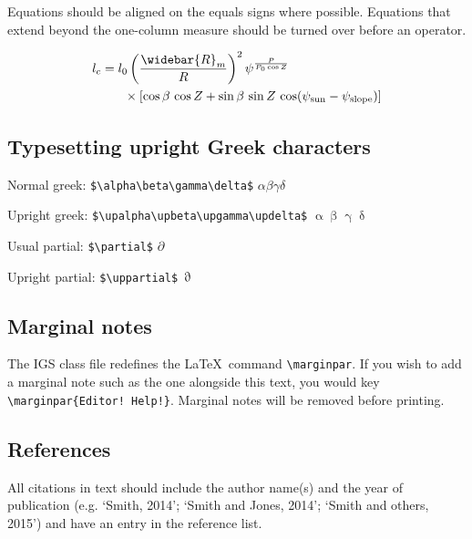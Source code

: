 \documentclass[aog]{igs}
\begin{document}
Equations should be aligned on the equals signs where possible. Equations that extend beyond the one-column measure should be turned over before an operator. 

\begin{equation}
\label{eqnarrayexample}
\begin{aligned}
l_c & =  l_0 \left(\frac{\widebar{R}_m}{R} \right)^2
  \psi^{\frac{P}{P_0\cos Z}}\\
    & \phantom{=} \quad  \times [\cos\beta\, \cos Z
    + \sin\beta\,\sin Z\,\cos(\psi_\mathrm{sun}
    - \psi_\mathrm{slope})]
\end{aligned}
\end{equation}

\subsection{Typesetting upright Greek characters}

Normal greek: \verb|$\alpha\beta\gamma\delta$|
$\alpha\beta\gamma\delta$ 

Upright greek:  \verb|$\upalpha\upbeta\upgamma\updelta$|
$\upalpha\upbeta\upgamma\updelta$

Usual partial: \verb|$\partial$| $\partial$

Upright partial: \verb|$\uppartial$| $\uppartial$

\subsection{Marginal notes}

The IGS class file redefines the \LaTeX\ command \verb"\marginpar". If you wish to add a marginal note such as the one alongside this text, you would key \verb"\marginpar{Editor! Help!}". Marginal notes will be removed before printing.

\subsection{References}

All citations in text should include the author name(s) and the year of publication (e.g. `Smith, 2014'; `Smith and Jones, 2014'; `Smith and others, 2015') and have an entry in the reference list. 
\end{document}
